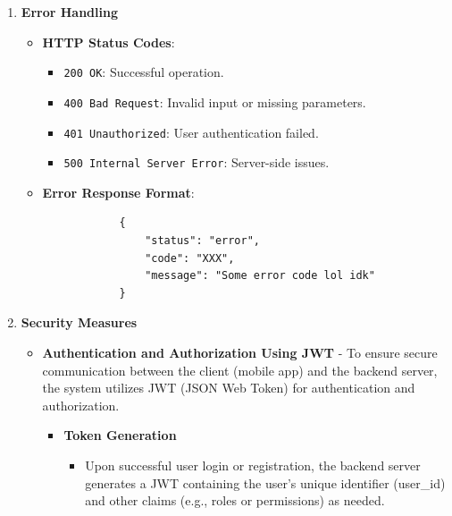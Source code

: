 \documentclass[12pt, titlepage]{article}
\begin{document}
\begin{enumerate}
\begin{itemize}
		\item \textbf{PUT/update-budget}
		\begin{itemize}
			\item \textbf{Request}:
			\begin{verbatim}
				{
					"userId": "12345",
					"budget": {
						"Groceries": 200,
						"Entertainment": 100
					}
				}
			\end{verbatim}
			\item \textbf{Response}:
			\begin{verbatim}
				{
					"status": "success",
					"message": "Budget updated successfully."
				}
			\end{verbatim}
		\end{itemize}
	\end{itemize}
	\item \textbf{Error Handling}
	\begin{itemize}
		\item \textbf{HTTP Status Codes}:
		\begin{itemize}
			\item \texttt{200 OK}: Successful operation.
			\item \texttt{400 Bad Request}: Invalid input or missing parameters.
			\item \texttt{401 Unauthorized}: User authentication failed.
			\item \texttt{500 Internal Server Error}: Server-side issues.
		\end{itemize}
		\item \textbf{Error Response Format}:
		\begin{verbatim}
			{
				"status": "error",
				"code": "XXX",
				"message": "Some error code lol idk"
			}
		\end{verbatim}
	\end{itemize}
	\item \textbf{Security Measures}
	\begin{itemize}
		\item \textbf{Authentication and Authorization Using JWT} - To ensure secure communication between the client (mobile app) and the backend server, the system utilizes JWT (JSON Web Token) for authentication and authorization.
		\begin{itemize}
			\item \textbf{Token Generation}
			\begin{itemize}
				\item Upon successful user login or registration, the backend server generates a JWT containing the user's unique identifier (user\_id) and other claims (e.g., roles or permissions) as needed.

\end{itemize}
\end{itemize}
\end{itemize}
\end{enumerate}
\end{document}
